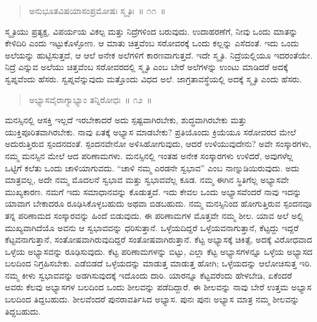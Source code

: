 \vspace{-0.2cm}

\begin{verse}
ಅನುಭೂತವಿಷಯಾಸಂಪ್ರಮೋಷಃ ಸ್ಮೃತಿಃ~॥ ೧೧~॥
\end{verse}

\vspace{-0.1cm}


ಸ್ಮೃತಿಯು ಪ್ರತ್ಯಕ್ಷ, ವಿಪರ್ಯಯ ವಿಕಲ್ಪ ಮತ್ತು ನಿದ್ರೆಗಳಿಂದ ಬರುವುದು. ಉದಾಹರಣೆಗೆ, ನೀವು ಒಂದು ಮಾತನ್ನು ಕೇಳಿದಿರಿ ಎಂದು ಇಟ್ಟುಕೊಳ್ಳೋಣ. ಆ ಮಾತು ಚಿತ್ತವೆಂಬ ಸರೋವರಕ್ಕೆ ಒಂದು ಕಲ್ಲನ್ನು ಎಸೆದಂತೆ. ಇದು ಒಂದು ಅಲೆಯನ್ನು ಹುಟ್ಟಿಸುತ್ತದೆ, ಆ ಆಲೆ ಅನೇಕ ಅಲೆಗಳಿಗೆ ಕಾರಣವಾಗುತ್ತದೆ. ಇದೇ ಸ್ಮೃತಿ. ನಿದ್ರೆಯಲ್ಲಿಯೂ ಇದರಂತೆಯೇ. ನಿದ್ರೆ ಎನ್ನುವ ಅಲೆಯು ಚಿತ್ತವೆಂಬ ಸರೋವರದಲ್ಲಿ ಸ್ಮೃತಿ ಎಂಬ ಬೇರೆ ಅಲೆಗಳನ್ನು ಉಂಟು ಮಾಡಿದರೆ ಅದಕ್ಕೆ ಸ್ವಪ್ನವೆಂದು ಹೆಸರು. ಸ್ವಪ್ನವೆನ್ನುವುದು ಮತ್ತೊಂದು ವಿಧದ ಅಲೆ. ಜಾಗ್ರತಾವಸ್ಥೆಯಲ್ಲಿ ಅದಕ್ಕೆ ಸ್ಮೃತಿ ಎಂದು ಹೆಸರು. 

\vspace{-0.2cm}

\begin{verse}
ಅಭ್ಯಾಸವೈರಾಗ್ಯಾಭ್ಯಾಂ ತನ್ನಿರೋಧಃ~॥ ೧೨~॥
\end{verse}

\vspace{-0.1cm}


ಮನಸ್ಸಿನಲ್ಲಿ ಆಸಕ್ತಿ ಇಲ್ಲದೆ ಇರಬೇಕಾದರೆ ಅದು ಸ್ಪಷ್ಟವಾಗಿರಬೇಕು, ಶುದ್ಧವಾಗಿರಬೇಕು ಮತ್ತು ಯುಕ್ತಿಪೂರಿತವಾಗಿರಬೇಕು. ನಾವು ಏತಕ್ಕೆ ಅಭ್ಯಾಸ ಮಾಡಬೇಕು? ಪ್ರತಿಯೊಂದು ಕ್ರಿಯೆಯೂ ಸರೋವರದ ಮೇಲೆ ಅದುರುತ್ತಿರುವ ಸ್ಪಂದನದಂತೆ. ಸ್ಪಂದನವೇನೋ ಅಳಿಸಿಹೋಗುವುದು, ಆದರೆ ಉಳಿಯುವುದೇನು? ಅವೇ ಸಂಸ್ಕಾರಗಳು, ನಮ್ಮ ಮನಸ್ಸಿನ ಮೇಲೆ ಆದ ಪರಿಣಾಮಗಳು. ಮನಸ್ಸಿನಲ್ಲಿ ಇಂತಹ ಅನೇಕ ಸಂಸ್ಕಾರಗಳು ಉಳಿದರೆ, ಅವುಗಳೆಲ್ಲ ಒಟ್ಟಿಗೆ ಕಲೆತು ಒಂದು ಚಾಳಿಯಾಗುವದು. “ಚಾಳಿ ನಮ್ಮ ಎರಡನೇ ಸ್ವಭಾವ” ಎಂಬ ನಾಣ್ನುಡಿಯಿರುವುದು. ಅದು ಮಾತ್ರವಲ್ಲ, ಅದೇ ನಮ್ಮ ಮೊದಲನೆ ಸ್ವಭಾವ ಮತ್ತು ಸ್ವಭಾವವೆಲ್ಲ ಕೂಡ. ನಮ್ಮ ಈಗಿನ ಸ್ಥಿತಿಗೆಲ್ಲ ಅಭ್ಯಾಸವೇ ಮುಖ್ಯಕಾರಣ. ನಮಗೆ ಇದು ಸಮಾಧಾನವನ್ನು ಕೊಡುತ್ತದೆ. ಇದು ಕೇವಲ ಒಂದು ಅಭ್ಯಾಸವೆಂದರೆ ನಾವು ಇದನ್ನು ಯಾವಾಗ ಬೇಕಾದರೂ ರೂಢಿಸಿಕೊಳ್ಳಬಹುದು ಅಥವಾ ಬಿಡಬಹುದು. ನಮ್ಮ ಮನಸ್ಸಿನಿಂದ ಹೋಗುತ್ತಿರುವ ಸ್ಪಂದನವೂ ತನ್ನ ಪರಿಣಾಮದ ಸಂಸ್ಕಾರವನ್ನು ಹಿಂದೆ ಬಿಡುವುದು. ಈ ಪರಿಣಾಮಗಳ ಮೊತ್ತವೇ ನಮ್ಮ ಶೀಲ. ಯಾವ ಅಲೆ ಅಲ್ಲಿ ಮುಖ್ಯವಾಗಿದೆಯೊ ಅವನು ಆ ಸ್ವಭಾವವನ್ನು ಧರಿಸುತ್ತಾನೆ. ಒಳ್ಳೆಯದಿದ್ದರೆ ಒಳ್ಳೆಯವನಾಗುತ್ತಾನೆ, ಕೆಟ್ಟದ್ದು ಇದ್ದರೆ ಕೆಟ್ಟವನಾಗುತ್ತಾನೆ, ಸಂತೋಷವಾಗಿರುವುದಿದ್ದರೆ ಸಂತೋಷವಾಗಿರುತ್ತಾನೆ. ಕೆಟ್ಟ ಅಭ್ಯಾಸಕ್ಕೆ ಚಿಕಿತ್ಸೆ, ಅದಕ್ಕೆ ವಿರೋಧವಾದ ಒಳ್ಳೆಯ ಅಭ್ಯಾಸವನ್ನು ರೂಢಿಸುವುದು. ಕೆಟ್ಟ ಪರಿಣಾಮಗಳನ್ನು ಬಿಟ್ಟು, ಎಲ್ಲಾ ಕೆಟ್ಟ ಅಭ್ಯಾಸಗಳನ್ನೂ ಒಳ್ಳೆಯ ಅಭ್ಯಾಸದ ಬಲದಿಂದ ನಿಗ್ರಹಿಸಬೇಕು. ಎಡೆಬಿಡದೆ ಒಳ್ಳೆಯದನ್ನು ಮಾಡುತ್ತ ಮಾಡುತ್ತ ಹೋಗಿ; ಒಳ್ಳೆಯದನ್ನು ಆಲೋಚಿಸುತ್ತ ಇರಿ. ನಮ್ಮ ಕೀಳು ಸ್ವಭಾವವನ್ನು ಅಡಗಿಸುವುದಕ್ಕೆ ಇದೊಂದು ದಾರಿ. ಯಾರನ್ನೂ ಕೆಟ್ಟವರೆಂದು ಹೇಳಬೇಡಿ, ಏಕೆಂದರೆ ಅವರು ಕೆಲವು ಅಭ್ಯಾಸಗಳ ಬಲದಿಂದ ಒಂದು ಶೀಲವನ್ನು ಪಡೆದಿದ್ದಾರೆ. ಈ ಶೀಲವನ್ನು ನಾವು ಬೇರೆ ಉತ್ತಮ ಅಭ್ಯಾಸ ಬಲದಿಂದ ತಿದ್ದಬಹುದು. ಶೀಲವೆಂದರೆ ಪುನರಾವರ್ತಿಸಿದ ಅಭ್ಯಾಸ. ಪುನಃ ಪುನಃ ಅಭ್ಯಾಸ ಮಾತ್ರ ನಮ್ಮ ಶೀಲವನ್ನು ತಿದ್ದಬಹುದು. 

